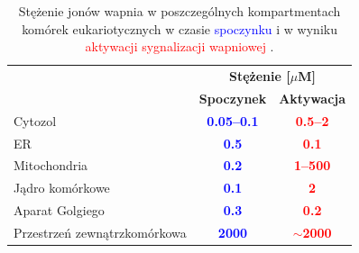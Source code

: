 \begin{table}[t]
\large
\centering
\begin{tabular}{lcc}\toprule[0.12em]
\rule[-2ex]{0pt}{5.5ex} \multirow{2}{*}{\textbf{Kompartment}} & \multicolumn{2}{c}{\textbf{Stężenie [$\mu$M]}}\\\cmidrule{2-3}
\rule[-2ex]{0pt}{5.5ex} & \textbf{Spoczynek} & \textbf{Aktywacja} \\\midrule[0.06em]
\rule[-2ex]{0pt}{5.5ex} Cytozol & \textcolor{blue}{\textbf{0.05--0.1}} & \textcolor{red}{\textbf{0.5--2}} \\
\rule[-2ex]{0pt}{5.5ex} ER & \textcolor{blue}{\textbf{0.5}} & \textcolor{red}{\textbf{\textbf{0.1}}} \\
\rule[-2ex]{0pt}{5.5ex} Mitochondria & \textcolor{blue}{\textbf{\textbf{0.2}}} & \textcolor{red}{\textbf{1--500}} \\
\rule[-2ex]{0pt}{5.5ex} Jądro komórkowe & \textcolor{blue}{\textbf{0.1}} & \textcolor{red}{\textbf{2}} \\
\rule[-2ex]{0pt}{5.5ex} Aparat Golgiego & \textcolor{blue}{\textbf{0.3}} & \textcolor{red}{\textbf{0.2}} \\
\rule[-2ex]{0pt}{5.5ex} Przestrzeń zewnątrzkomórkowa & \textcolor{blue}{\textbf{2000}} & \textcolor{red}{\textbf{$\sim$2000}} \\ \bottomrule[0.12em]
\end{tabular}
\caption[Stężenie jonów wapnia w kompartmentach]{Stężenie jonów wapnia w poszczególnych kompartmentach komórek eukariotycznych w czasie \textcolor{blue}{spoczynku} i w wyniku \textcolor{red}{aktywacji sygnalizacji wapniowej} \cite{Laude2009}.}
\label{tab:caakt}
\end{table}

